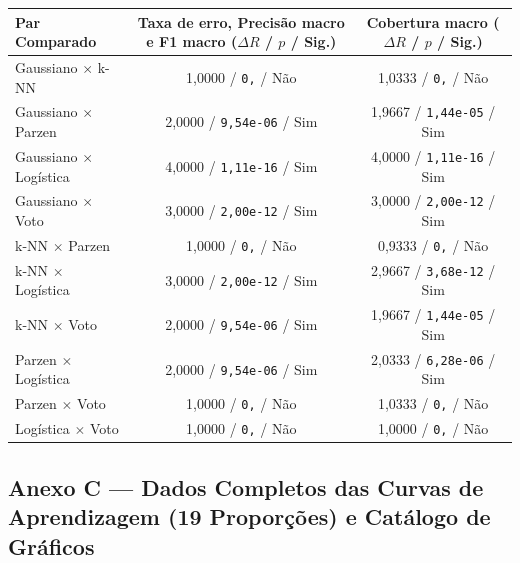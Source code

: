 \documentclass[a4paper,11pt]{article}
\begin{document}
\begin{center}
\begin{minipage}{\linewidth}
\centering
{}
\footnotesize
\sloppy
\setlength{\tabcolsep}{2.5pt}
\renewcommand{\arraystretch}{1.18}
\begin{tabularx}{\linewidth}{P{3.4cm} C C}
\toprule
\textbf{Par Comparado} & \textbf{Taxa de erro, Precisão macro e F1 macro ($\Delta R$ / $p$ / Sig.)} & \textbf{Cobertura macro ($\Delta R$ / $p$ / Sig.)} \\
\midrule
Gaussiano $\times$ k-NN & 1,0000 / \texttt{0,} / Não & 1,0333 / \texttt{0,} / Não \\
Gaussiano $\times$ Parzen & 2,0000 / \texttt{9,\allowbreak 54e-06} / Sim & 1,9667 / \texttt{1,\allowbreak 44e-05} / Sim \\
Gaussiano $\times$ Logística & 4,0000 / \texttt{1,\allowbreak 11e-16} / Sim & 4,0000 / \texttt{1,\allowbreak 11e-16} / Sim \\
Gaussiano $\times$ Voto & 3,0000 / \texttt{2,\allowbreak 00e-12} / Sim & 3,0000 / \texttt{2,\allowbreak 00e-12} / Sim \\
k-NN $\times$ Parzen & 1,0000 / \texttt{0,} / Não & 0,9333 / \texttt{0,} / Não \\
k-NN $\times$ Logística & 3,0000 / \texttt{2,\allowbreak 00e-12} / Sim & 2,9667 / \texttt{3,\allowbreak 68e-12} / Sim \\
k-NN $\times$ Voto & 2,0000 / \texttt{9,\allowbreak 54e-06} / Sim & 1,9667 / \texttt{1,\allowbreak 44e-05} / Sim \\
Parzen $\times$ Logística & 2,0000 / \texttt{9,\allowbreak 54e-06} / Sim & 2,0333 / \texttt{6,\allowbreak 28e-06} / Sim \\
Parzen $\times$ Voto & 1,0000 / \texttt{0,} / Não & 1,0333 / \texttt{0,} / Não \\
Logística $\times$ Voto & 1,0000 / \texttt{0,} / Não & 1,0000 / \texttt{0,} / Não \\
\bottomrule
\end{tabularx}
\end{minipage}
\end{center}



\subsection*{Anexo C --- Dados Completos das Curvas de Aprendizagem (19 Proporções) e Catálogo de Gráficos}\label{sec:anexo-c-dados-completos-das-curvas-de-aprendizagem-19-proporcoes-e-catalogo-de-graficos}
\end{document}
